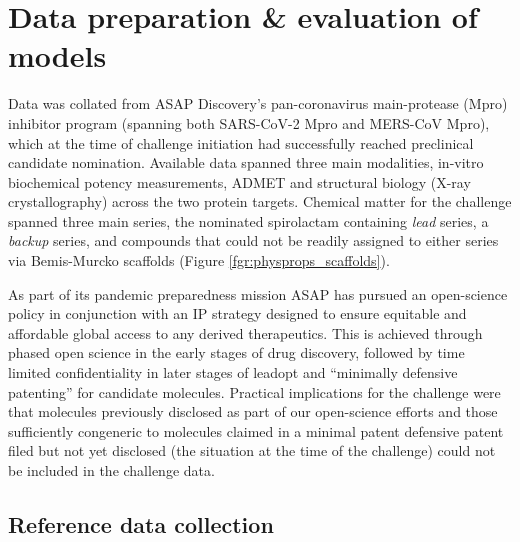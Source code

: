 \documentclass[journal=jcim,manuscript=article]{achemso}
\begin{document}
\section{Data preparation \& evaluation of models}

Data was collated from ASAP Discovery’s pan-coronavirus main-protease (Mpro) inhibitor program (spanning both SARS-CoV-2 Mpro and MERS-CoV Mpro), which at the time of challenge initiation had successfully reached preclinical candidate nomination. Available data spanned three main modalities, in-vitro biochemical potency measurements, ADMET and structural biology (X-ray crystallography) across the two protein targets. Chemical matter for the challenge spanned three main series, the nominated spirolactam containing \textit{lead} series, a \textit{backup} series, and compounds that could not be readily assigned to either series via Bemis-Murcko scaffolds\cite{bemis_murcko_1996} (Figure \ref{fgr:physprops_scaffolds}). 

As part of its pandemic preparedness mission ASAP has pursued an open-science policy in conjunction with an IP strategy designed to ensure equitable and affordable global access to any derived therapeutics. This is achieved through phased open science in the early stages of drug discovery, followed by time limited confidentiality in later stages of leadopt and “minimally defensive patenting” for candidate molecules\cite{griffen_2024}. Practical implications for the challenge were that molecules previously disclosed as part of our open-science efforts and those sufficiently congeneric to molecules claimed in a minimal patent defensive patent filed but not yet disclosed (the situation at the time of the challenge) could not be included in the challenge data.


\subsection{Reference data collection}
\end{document}
